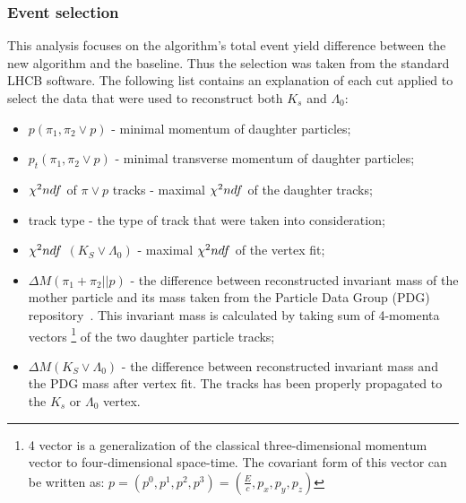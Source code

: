 \subsubsection{Event selection}

This analysis focuses on the algorithm's total event yield difference between the new algorithm and the baseline. Thus the selection was taken from the standard LHCB software. The following list contains an explanation of each cut applied to select the data that were used to reconstruct both $K_s$ and $\Lambda_{0}$:

\begin{itemize}
    \item \textbf{$p(\pi_1, \pi_2 \lor p)$} - minimal momentum of daughter particles;
    \item \textbf{$p_t(\pi_1, \pi_2 \lor p)$} - minimal transverse momentum of daughter particles;
    \item $\chi^2\/ndf$ of $\pi \lor p$ tracks - maximal  $\chi^2\/ndf$ of the daughter tracks;
    \item track type - the type of track that were taken into consideration;
    \item $\chi^2\/ndf$ $(K_S \lor \Lambda_0)$ - maximal $\chi^2\/ndf$ of the vertex fit;
    \item $\Delta M(\pi_1 + \pi_2 || p)$ - the difference between reconstructed invariant mass of the mother particle and its mass taken from the Particle Data Group (PDG) repository~\cite{PDG}. This invariant mass is calculated by taking sum of 4-momenta vectors \footnote{4 vector is a generalization of the classical three-dimensional momentum vector to four-dimensional space-time. The covariant form of this vector can be written as: $p= (p^{0}, p^{1}, p^{2}, p^{3}) = (\frac{E}{c},p_x,p_y,p_z) $ }  of the two daughter particle tracks;   
    \item $\Delta M(K_S \lor \Lambda_0)$ -  the difference between reconstructed invariant mass and the PDG mass after vertex fit. The tracks has been properly propagated to the $K_s$ or $\Lambda_0$  vertex. 
\end{itemize}

